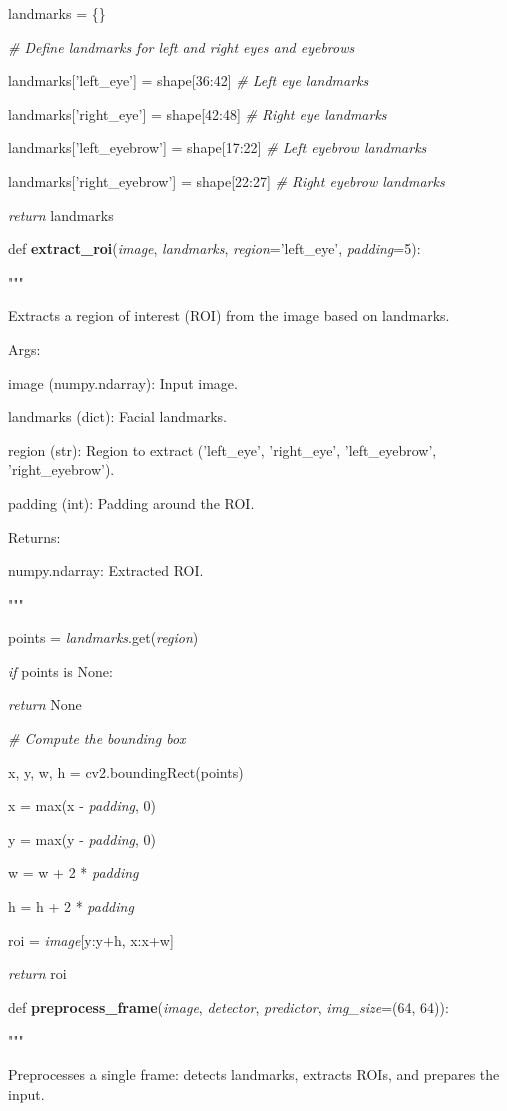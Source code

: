 \documentclass[
]{article}
\begin{document}
landmarks = \{\}

\emph{\# Define landmarks for left and right eyes and eyebrows}

landmarks{[}'left\_eye'{]} = shape{[}36:42{]} \emph{\# Left eye landmarks}

landmarks{[}'right\_eye'{]} = shape{[}42:48{]} \emph{\# Right eye landmarks}

landmarks{[}'left\_eyebrow'{]} = shape{[}17:22{]} \emph{\# Left eyebrow landmarks}

landmarks{[}'right\_eyebrow'{]} = shape{[}22:27{]} \emph{\# Right eyebrow landmarks}

\emph{return} landmarks

def \textbf{extract\_roi}(\emph{image}, \emph{landmarks}, \emph{region}='left\_eye', \emph{padding}=5):

"""

Extracts a region of interest (ROI) from the image based on landmarks.

Args:

image (numpy.ndarray): Input image.

landmarks (dict): Facial landmarks.

region (str): Region to extract ('left\_eye', 'right\_eye', 'left\_eyebrow', 'right\_eyebrow').

padding (int): Padding around the ROI.

Returns:

numpy.ndarray: Extracted ROI.

"""

points = \emph{landmarks}.get(\emph{region})

\emph{if} points is None:

\emph{return} None

\emph{\# Compute the bounding box}

x, y, w, h = cv2.boundingRect(points)

x = max(x - \emph{padding}, 0)

y = max(y - \emph{padding}, 0)

w = w + 2 * \emph{padding}

h = h + 2 * \emph{padding}

roi = \emph{image}{[}y:y+h, x:x+w{]}

\emph{return} roi

def \textbf{preprocess\_frame}(\emph{image}, \emph{detector}, \emph{predictor}, \emph{img\_size}=(64, 64)):

"""

Preprocesses a single frame: detects landmarks, extracts ROIs, and prepares the input.
\end{document}
